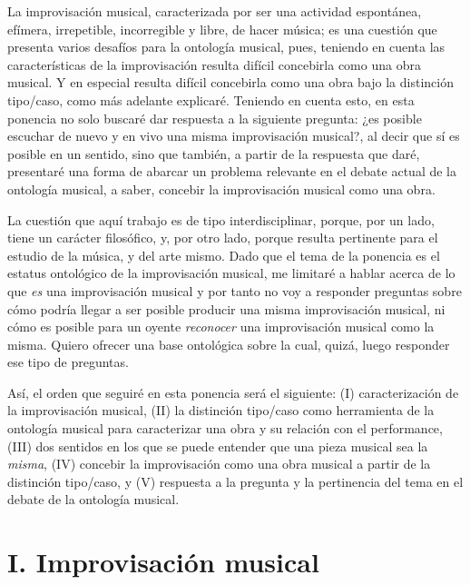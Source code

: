 \documentclass[]{book}
\begin{document}
La improvisación musical, caracterizada por ser una actividad
espontánea, efímera, irrepetible, incorregible y libre, de hacer música;
es una cuestión que presenta varios desafíos para la ontología musical,
pues, teniendo en cuenta las características de la improvisación resulta
difícil concebirla como una obra musical. Y en especial resulta difícil
concebirla como una obra bajo la distinción tipo/caso, como más adelante
explicaré. Teniendo en cuenta esto, en esta ponencia no solo buscaré dar
respuesta a la siguiente pregunta: ¿es posible escuchar de nuevo y en
vivo una misma improvisación musical?, al decir que sí es posible en un
sentido, sino que también, a partir de la respuesta que daré, presentaré
una forma de abarcar un problema relevante en el debate actual de la
ontología musical, a saber, concebir la improvisación musical como una
obra.

La cuestión que aquí trabajo es de tipo interdisciplinar, porque, por un
lado, tiene un carácter filosófico, y, por otro lado, porque resulta
pertinente para el estudio de la música, y del arte mismo. Dado que el
tema de la ponencia es el estatus ontológico de la improvisación
musical, me limitaré a hablar acerca de lo que \emph{es} una
improvisación musical y por tanto no voy a responder preguntas sobre
cómo podría llegar a ser posible producir una misma improvisación
musical, ni cómo es posible para un oyente \emph{reconocer} una
improvisación musical como la misma. Quiero ofrecer una base ontológica
sobre la cual, quizá, luego responder ese tipo de preguntas.

Así, el orden que seguiré en esta ponencia será el siguiente: (I)
caracterización de la improvisación musical, (II) la distinción tipo/caso
como herramienta de la ontología musical para caracterizar una obra y su
relación con el performance, (III) dos sentidos en los que se puede
entender que una pieza musical sea la \emph{misma}, (IV) concebir la
improvisación como una obra musical a partir de la distinción tipo/caso,
y (V) respuesta a la pregunta y la pertinencia del tema en el debate de
la ontología musical.

\section*{I. Improvisación musical}
\end{document}
